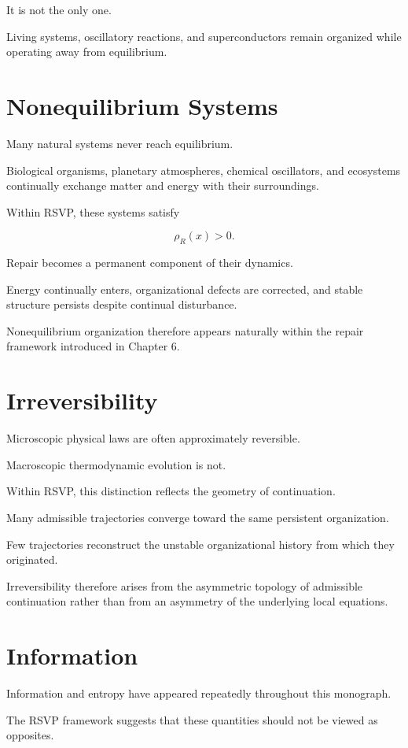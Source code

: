 \documentclass[11pt,oneside]{book}
\numberwithin{equation}{chapter}
\theoremstyle{definition}
\theoremstyle{plain}
\begin{document}
It is not the only one.

Living systems, oscillatory reactions, and superconductors remain organized
while operating away from equilibrium.

\section{Nonequilibrium Systems}

Many natural systems never reach equilibrium.

Biological organisms, planetary atmospheres, chemical oscillators, and
ecosystems continually exchange matter and energy with their surroundings.

Within RSVP, these systems satisfy

\[
\rho_R(x)>0.
\]

Repair becomes a permanent component of their dynamics.

Energy continually enters, organizational defects are corrected, and stable
structure persists despite continual disturbance.

Nonequilibrium organization therefore appears naturally within the repair
framework introduced in Chapter 6.

\section{Irreversibility}

Microscopic physical laws are often approximately reversible.

Macroscopic thermodynamic evolution is not.

Within RSVP, this distinction reflects the geometry of continuation.

Many admissible trajectories converge toward the same persistent
organization.

Few trajectories reconstruct the unstable organizational history from which
they originated.

Irreversibility therefore arises from the asymmetric topology of admissible
continuation rather than from an asymmetry of the underlying local
equations.

\section{Information}

Information and entropy have appeared repeatedly throughout this monograph.

The RSVP framework suggests that these quantities should not be viewed as
opposites.
\end{document}
